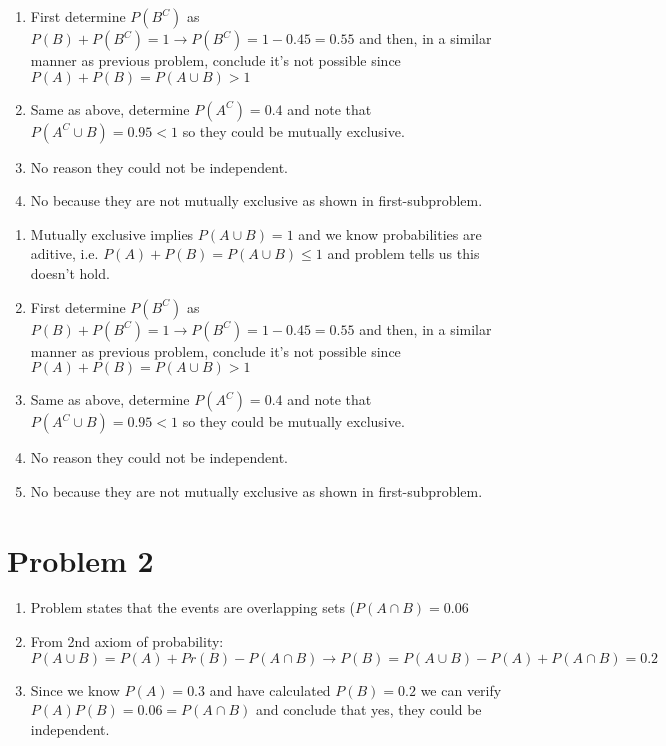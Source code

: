 \documentclass{article}
\newcommand{\1}{\mathbf{1}}
\begin{document}
\begin{enumerate}
	\item First determine $P(B^C)$ as $P(B)+P(B^C)=1 \rightarrow P(B^C)=1-0.45=0.55$ and then, in a similar manner as previous problem, conclude it's not possible since  $P(A)+P(B)=P(A\cup B) > 1$
	\item Same as above, determine $P(A^C)=0.4$ and note that $P(A^C\cup B)=0.95<1$ so they could be mutually exclusive.
	\item No reason they could not be independent. 
	\item No because they are not mutually exclusive as shown in first-subproblem.
\end{enumerate}




\begin{enumerate}
	\item Mutually exclusive implies $P(A\cup B)=1$ and we know probabilities are aditive, i.e. $P(A)+P(B)=P(A\cup B)\leq 1$ and problem tells us this doesn't hold.
	\item First determine $P(B^C)$ as $P(B)+P(B^C)=1 \rightarrow P(B^C)=1-0.45=0.55$ and then, in a similar manner as previous problem, conclude it's not possible since  $P(A)+P(B)=P(A\cup B) > 1$
	\item Same as above, determine $P(A^C)=0.4$ and note that $P(A^C\cup B)=0.95<1$ so they could be mutually exclusive.
	\item No reason they could not be independent. 
	\item No because they are not mutually exclusive as shown in first-subproblem.
\end{enumerate}

\section*{Problem 2}
\begin{enumerate}
	\item Problem states that the events are overlapping sets ($P(A\cap B) =0.06$
	\item From 2nd axiom of probability: $P(A\cup B) = P(A) + Pr(B) - P(A\cap B) \rightarrow P(B) = P(A\cup B)  - P(A) + P(A\cap B) = 0.2$
	\item Since we know $P(A)=0.3$ and have calculated $P(B)=0.2$ we can verify $P(A)P(B)=0.06=P(A\cap B)$ and conclude that yes, they could be independent.
\end{enumerate}
\end{document}
